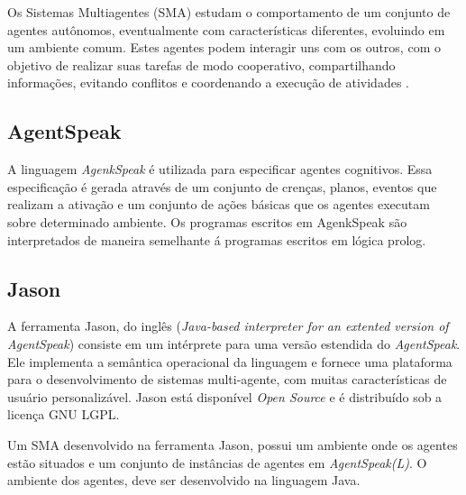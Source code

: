\documentclass[conference]{IEEEtran}
\begin{document}
        Os Sistemas Multiagentes (SMA) estudam o comportamento de um conjunto de agentes autônomos, eventualmente com características diferentes, evoluindo em um ambiente comum. Estes agentes podem interagir uns com os outros, com o objetivo de realizar suas tarefas de modo cooperativo, compartilhando informações, evitando conflitos e coordenando a execução de atividades \cite{alvares1997introduccao}.
        
        \subsection{AgentSpeak}
        A linguagem \textit{AgenkSpeak} é utilizada para especificar agentes cognitivos. Essa especificação é gerada através de um conjunto de crenças, planos, eventos que realizam a ativação e um conjunto de ações básicas que os agentes executam sobre determinado ambiente. Os programas escritos em AgenkSpeak  são interpretados de maneira semelhante á programas escritos em lógica prolog.
        
        \subsection{Jason}
        A ferramenta Jason, do inglês (\textit{Java-based interpreter for an extented version of AgentSpeak}) consiste em um intérprete para uma versão estendida do \textit{AgentSpeak}. Ele implementa a semântica operacional da linguagem e fornece uma plataforma para o desenvolvimento de sistemas multi-agente, com muitas características de usuário personalizável. Jason está disponível \textit{Open Source} e é distribuído sob a licença GNU LGPL.
        
        Um SMA desenvolvido na ferramenta Jason, possui um ambiente onde os agentes estão situados e um conjunto de instâncias de agentes em \textit{AgentSpeak(L)}. O ambiente dos agentes, deve ser desenvolvido na linguagem Java. %
        
\end{document}
